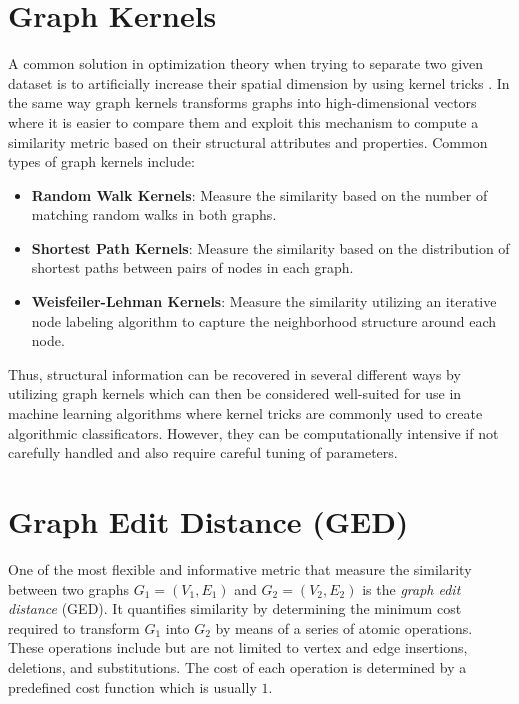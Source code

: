 \documentclass[../Thesis.tex]{subfiles}
\begin{document}
	
	
	\section{Graph Kernels}
	
	A common solution in optimization theory when trying to separate two given dataset is to artificially increase their spatial dimension by using kernel tricks \cite{kerneltrick}. In the same way graph kernels transforms graphs into high-dimensional vectors where it is easier to compare them and exploit this mechanism to compute a similarity metric based on their structural attributes and properties. Common types of graph kernels include:
	
	\begin{itemize}
		\item \textbf{Random Walk Kernels}: Measure the similarity based on the number of matching random walks in both graphs.
		\item \textbf{Shortest Path Kernels}: Measure the similarity based on the distribution of shortest paths between pairs of nodes in each graph.
		\item \textbf{Weisfeiler-Lehman Kernels}: Measure the similarity utilizing an iterative node labeling algorithm to capture the neighborhood structure around each node.
	\end{itemize}
	
	Thus, structural information can be recovered in several different ways by utilizing graph kernels which can then be considered well-suited for use in machine learning algorithms where kernel tricks are commonly used to create algorithmic classificators. However, they can be computationally intensive if not carefully handled and also require careful tuning of parameters.
	
	
	
	\section{Graph Edit Distance (GED)}
	
	One of the most flexible and informative metric that measure the similarity between two graphs $G_1 = (V_1, E_1)$ and $G_2 = (V_2, E_2)$ is the \emph{graph edit distance} (GED). It quantifies similarity by determining the minimum cost required to transform $G_1$ into $G_2$ by means of a series of atomic operations. These operations include but are not limited to vertex and edge insertions, deletions, and substitutions. The cost of each operation is determined by a predefined cost function which is usually $1$.
	
\end{document}
